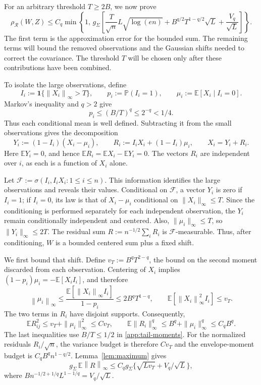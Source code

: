\documentclass[11pt,letterpaper,twoside,leqno]{article}
\theoremstyle{bookplain}
\theoremstyle{bookremark}
\newcommand{\E}{\mathbb E}
\newcommand{\Pp}{\mathbb P}
\newcommand{\norm}[1]{\left\lVert#1\right\rVert}
\newcommand{\rh}{\rho_{\mathcal R}}
\newcommand{\ind}{\mathbf 1}
\begin{document}
For an arbitrary threshold $T\ge2B$, we now prove
\begin{equation}
 \rh(W,Z)\le C_q\min\left\{1,\,
 g_\Sigma\left[
 \frac{T}{\sqrt n}L\sqrt{\log(en)}
 +B^{q/2}T^{1-q/2}\sqrt L+\frac{V_q}{\sqrt L}\right]\right\}.
 \label{poly:threshold}
\end{equation}
The first term is the approximation error for the bounded sum.
The remaining terms will bound the removed observations and the
Gaussian shifts needed to correct the covariance. The threshold
$T$ will be chosen only after these contributions have been combined.

To isolate the large observations, define
\[
 I_i:=\ind\{\norm{X_i}_\infty>T\},\qquad
 p_i:=\Pp(I_i=1),\qquad \mu_i:=\E[X_i\mid I_i=0].
\]
Markov's inequality and $q>2$ give
\begin{equation}
 p_i\le(B/T)^q\le2^{-q}<1/4.
 \label{app:p_i-bound}
\end{equation}
Thus each conditional mean is well defined. Subtracting it from
the small observations gives the decomposition
\begin{equation}
 Y_i:=(1-I_i)(X_i-\mu_i),\qquad
 R_i:=I_iX_i+(1-I_i)\mu_i,\qquad X_i=Y_i+R_i.
 \label{app:decomposition}
\end{equation}
Here $\E Y_i=0$, and hence $\E R_i=\E X_i-\E Y_i=0$.
The vectors $R_i$ are independent over $i$, as each is a function
of $X_i$ alone.

Let $\mathcal F:=\sigma(I_i,I_iX_i:1\le i\le n)$. This
information identifies the large observations and reveals their
values. Conditional on $\mathcal F$, a vector $Y_i$ is zero if
$I_i=1$; if $I_i=0$, its law is that of $X_i-\mu_i$ conditional
on $\|X_i\|_\infty\le T$. Since the conditioning is performed
separately for each independent observation, the $Y_i$ remain
conditionally independent and centered. Also,
$\|\mu_i\|_\infty\le T$, so $\|Y_i\|_\infty\le2T$.
The residual sum $R:=n^{-1/2}\sum_iR_i$ is
$\mathcal F$-measurable. Thus, after conditioning, $W$ is a
bounded centered sum plus a fixed shift.

We first bound that shift. Define $v_T:=B^qT^{2-q}$, the bound
on the second moment discarded from each observation. Centering
of $X_i$ implies $(1-p_i)\mu_i=-\E[X_iI_i]$, and therefore
\begin{equation}
 \norm{\mu_i}_\infty
 \le\frac{\E[\norm{X_i}_\infty I_i]}{1-p_i}
 \le2B^qT^{1-q},\qquad
 \E[\norm{X_i}_\infty^2 I_i]\le v_T.
 \label{app:tail-moments}
\end{equation}
The two terms in $R_i$ have disjoint supports. Consequently,
\[
 \E R_{ij}^2
 \le v_T+\|\mu_i\|_\infty^2\le Cv_T,
 \qquad
 \E\|R_i\|_\infty^q
 \le B^q+\|\mu_i\|_\infty^q\le C_qB^q.
\]
The last inequalities use $B/T\le1/2$ in
\eqref{app:tail-moments}. For the normalized residuals $R_i/\sqrt n$,
the variance budget is therefore $Cv_T$ and the envelope-moment
budget is $C_qB^qn^{1-q/2}$. Lemma~\ref{lem:maximum} gives
\begin{equation}
 g_\Sigma\,\E\norm R_\infty
 \le C_qg_\Sigma\{\sqrt{Lv_T}+V_q/\sqrt L\},
 \label{app:shift}
\end{equation}
where $Bn^{-1/2+1/q}L^{1-1/q}=V_q/\sqrt L$.
\end{document}
